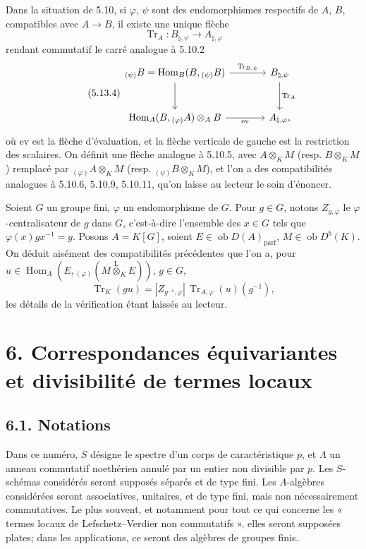 \documentclass[11pt]{article}
\DeclareMathOperator{\Hom}{Hom}
\newcommand{\ob}{\operatorname{ob}}
\providecommand{\Tr}{\operatorname{Tr}}
\providecommand{\Tr}{\operatorname{Tr}}
\providecommand{\lten}{\overset{\mathrm L}{\otimes}}
\providecommand{\Tr}{\operatorname{Tr}}
\providecommand{\Hom}{\operatorname{Hom}}
\providecommand{\ob}{\operatorname{ob}}
\providecommand{\lten}{\overset{\mathrm L}{\otimes}}
\providecommand{\lten}{\overset{\mathrm L}{\otimes}}
\providecommand{\Tr}{\operatorname{Tr}}
\providecommand{\lten}{\overset{\mathrm L}{\otimes}}
\providecommand{\lten}{\overset{\mathrm L}{\otimes}}
\providecommand{\lten}{\overset{\mathrm L}{\otimes}}
\providecommand{\Hom}{\operatorname{Hom}}
\providecommand{\Tr}{\operatorname{Tr}}
\providecommand{\lten}{\overset{\mathrm L}{\otimes}}
\begin{document}
Dans la situation de 5.10, si $\varphi$, $\psi$ sont des endomorphismes respectifs de $A$, $B$, compatibles avec $A\to B$, il existe une unique flèche
\[
\Tr_A:B_{\natural,\psi}\longrightarrow A_{\natural,\varphi}
\]
rendant commutatif le carré analogue à 5.10.2
\begin{equation}\tag{5.13.4}
\begin{tikzcd}[column sep=large,row sep=large]
{}_{(\psi)}B=\Hom_B(B,{}_{(\psi)}B) \arrow[r,"\Tr_{B,\psi}"] \arrow[d] & B_{\natural,\psi} \arrow[d,"\Tr_A"]\\
\Hom_A(B,{}_{(\varphi)}A)\otimes_AB \arrow[r,"\mathrm{ev}"'] & A_{\natural,\varphi},
\end{tikzcd}
\end{equation}
où $\mathrm{ev}$ est la flèche d'évaluation, et la flèche verticale de gauche est la restriction des scalaires. On définit une flèche analogue à 5.10.5, avec $A\otimes_KM$ (resp. $B\otimes_KM$) remplacé par ${}_{(\varphi)}A\otimes_KM$ (resp. ${}_{(\psi)}B\otimes_KM$), et l'on a des compatibilités analogues à 5.10.6, 5.10.9, 5.10.11, qu'on laisse au lecteur le soin d'énoncer.

Soient $G$ un groupe fini, $\varphi$ un endomorphisme de $G$. Pour $g\in G$, notons $Z_{g,\varphi}$ le $\varphi$-centralisateur de $g$ dans $G$, c'est-à-dire l'ensemble des $x\in G$ tels que $\varphi(x)gx^{-1}=g$. Posons $A=K[G]$, soient $E\in\ob D(A)_{\mathrm{parf}}$, $M\in\ob D^b(K)$. On déduit aisément des compatibilités précédentes que l'on a, pour $u\in\Hom_A(E,{}_{(\varphi)}(M\lten_KE))$, $g\in G$,
\begin{equation}\tag{5.13.5}
\Tr_K(gu)=|Z_{g^{-1},\varphi}|\,\Tr_{A,\varphi}(u)(g^{-1}),
\end{equation}
les détails de la vérification étant laissés au lecteur.

\section*{6. Correspondances équivariantes et divisibilité de termes locaux}

\subsection*{6.1. Notations}

Dans ce numéro, $S$ désigne le spectre d'un corps de caractéristique $p$, et $\Lambda$ un anneau commutatif noethérien annulé par un entier non divisible par $p$. Les $S$-schémas considérés seront supposés séparés et de type fini. Les $\Lambda$-algèbres considérées seront associatives, unitaires, et de type fini, mais non nécessairement commutatives. Le plus souvent, et notamment pour tout ce qui concerne les « termes locaux de Lefschetz--Verdier non commutatifs », elles seront supposées plates; dans les applications, ce seront des algèbres de groupes finis.
\end{document}
